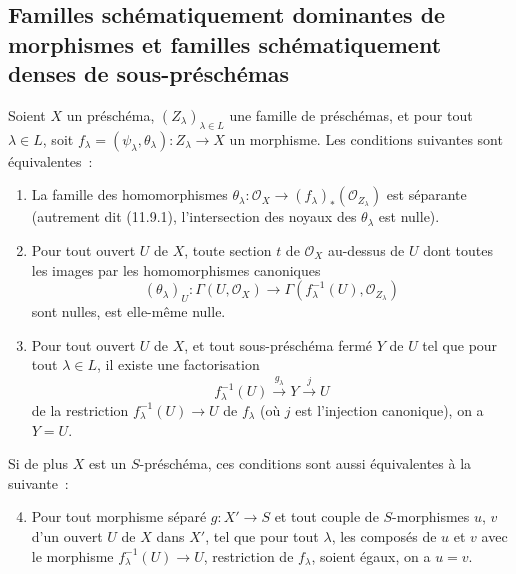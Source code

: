 \subsection{Familles schématiquement dominantes de morphismes et familles
schématiquement denses de sous-préschémas}
\label{subsection:IV.11.10-fr}

\begin{proposition}[11.10.1]
\label{IV.11.10.1-fr}
Soient $X$ un préschéma, $(Z_\lambda)_{\lambda\in L}$ une famille de
préschémas, et pour tout $\lambda\in L$, soit
$f_\lambda=(\psi_\lambda,\theta_\lambda):Z_\lambda\to X$ un morphisme. Les
conditions suivantes sont équivalentes~:
\begin{enumerate}[label=\emph{\alph*)}]
  \item La famille des homomorphismes
  $\theta_\lambda:\mathcal O_X\to(f_\lambda)_*(\mathcal O_{Z_\lambda})$ est
  séparante (autrement dit (11.9.1), l'intersection des noyaux des
  $\theta_\lambda$ est nulle).
  \item Pour tout ouvert $U$ de $X$, toute section $t$ de $\mathcal O_X$
  au-dessus de $U$ dont toutes les images par les homomorphismes canoniques
  \[
  (\theta_\lambda)_U:\Gamma(U,\mathcal O_X)
  \longrightarrow\Gamma(f_\lambda^{-1}(U),\mathcal O_{Z_\lambda})
  \tag{11.10.1.1}
  \label{IV.11.10.1.1-fr}
  \]
  sont nulles, est elle-même nulle.
  \item Pour tout ouvert $U$ de $X$, et tout sous-préschéma fermé $Y$ de $U$
  tel que pour tout $\lambda\in L$, il existe une factorisation
  \[
  f_\lambda^{-1}(U)\xrightarrow{g_\lambda}Y\xrightarrow{j}U
  \tag{11.10.1.2}
  \label{IV.11.10.1.2-fr}
  \]
  de la restriction $f_\lambda^{-1}(U)\to U$ de $f_\lambda$ (où $j$ est
  l'injection canonique), on a $Y=U$.
\end{enumerate}

Si de plus $X$ est un $S$-préschéma, ces conditions sont aussi équivalentes à
la suivante~:
\begin{enumerate}[label=\emph{\alph*)}]
\setcounter{enumi}{3}
  \item Pour tout morphisme séparé $g:X'\to S$ et tout couple de
  $S$-morphismes $u$, $v$ d'un ouvert $U$ de $X$ dans $X'$, tel que pour tout
  $\lambda$, les composés de $u$ et $v$ avec le morphisme
  $f_\lambda^{-1}(U)\to U$, restriction de $f_\lambda$, soient égaux, on a
  $u=v$.
\end{enumerate}
\end{proposition}

